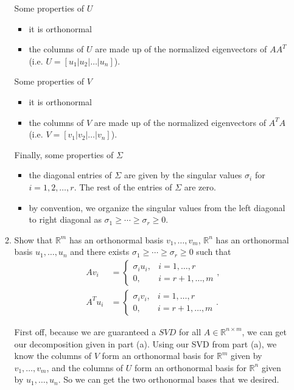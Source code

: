 \documentclass[a4paper,12pt]{article}
\newcommand{\reals}{\mathbb{R}}
\begin{document}
\begin{enumerate}[label = \arabic*.]
\begin{enumerate}[label = (\alph*)]
				Some properties of $ U $
				\begin{itemize}
					\item it is orthonormal
					\item the columns of $ U $ are made up of the normalized eigenvectors of $ AA^T $ (i.e. $ U = [u_1 | u_2 | \ldots | u_n] $).
				\end{itemize}
				Some properties of $ V $
				\begin{itemize}
					\item it is orthonormal
					\item the columns of $ V $ are made up of the normalized eigenvectors of $ A^TA $ (i.e. $ V = [v_1 | v_2 | \ldots | v_n] $).
				\end{itemize}
				Finally, some properties of $ \Sigma $
				\begin{itemize}
					\item the diagonal entries of $ \Sigma $ are given by the singular values $ \sigma_i $ for $ i = 1, 2, \ldots, r $. The rest of the entries of $ \Sigma $ are zero.
					\item by convention, we organize the singular values from the left diagonal to right diagonal as $ \sigma_1 \geq \cdots \geq \sigma_r \geq 0 $.
				\end{itemize}
				
				\item Show that $ \reals^m $ has an orthonormal basis $ v_1, \ldots, v_m $, $ \reals^n $ has an orthonormal basis $ u_1, \ldots, u_n $ and there exists $ \sigma_1 \geq \cdots \geq \sigma_r \geq 0 $ such that
				\begin{align*}
					A v_i &= \begin{cases}
						\sigma_i u_i, & i = 1, \ldots, r \\
						0, & i = r + 1, \ldots, m
					\end{cases}, \\
					A^T u_i &= \begin{cases}
						\sigma_i v_i, & i = 1, \ldots, r \\
						0, & i = r + 1, \ldots, m
					\end{cases}.
				\end{align*}
			
				First off, because we are guaranteed a $ SVD $ for all $ A \in \reals^{n \times m} $, we can get our decomposition given in part (a). Using our SVD from part (a), we know the columns of $ V $ form an orthonormal basis for $ \reals^m $ given by $ v_1, \ldots, v_m $, and the columns of $ U $ form an orthonormal basis for $ \reals^n $ given by $ u_1, \ldots, u_n $. So we can get the two orthonormal bases that we desired.
				

\end{enumerate}
\end{enumerate}
\end{document}
